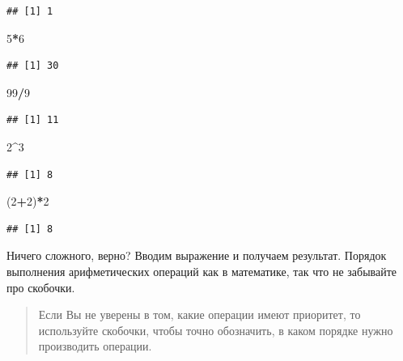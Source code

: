 \documentclass[]{book}
\newenvironment{Shaded}{\begin{snugshade}}{\end{snugshade}}
\newcommand{\DecValTok}[1]{\textcolor[rgb]{0.00,0.00,0.81}{#1}}
\newcommand{\NormalTok}[1]{#1}
\newcommand{\OperatorTok}[1]{\textcolor[rgb]{0.81,0.36,0.00}{\textbf{#1}}}
\begin{document}
\begin{verbatim}
## [1] 1
\end{verbatim}

\begin{Shaded}
\begin{Highlighting}[]
\DecValTok{5}\OperatorTok{*}\DecValTok{6}
\end{Highlighting}
\end{Shaded}

\begin{verbatim}
## [1] 30
\end{verbatim}

\begin{Shaded}
\begin{Highlighting}[]
\DecValTok{99}\OperatorTok{/}\DecValTok{9}
\end{Highlighting}
\end{Shaded}

\begin{verbatim}
## [1] 11
\end{verbatim}

\begin{Shaded}
\begin{Highlighting}[]
\DecValTok{2}\OperatorTok{^}\DecValTok{3}
\end{Highlighting}
\end{Shaded}

\begin{verbatim}
## [1] 8
\end{verbatim}

\begin{Shaded}
\begin{Highlighting}[]
\NormalTok{(}\DecValTok{2}\OperatorTok{+}\DecValTok{2}\NormalTok{)}\OperatorTok{*}\DecValTok{2}
\end{Highlighting}
\end{Shaded}

\begin{verbatim}
## [1] 8
\end{verbatim}

Ничего сложного, верно? Вводим выражение и получаем результат. Порядок выполнения арифметических операций как в математике, так что не забывайте про скобочки.

\begin{quote}
Если Вы не уверены в том, какие операции имеют приоритет, то используйте скобочки, чтобы точно обозначить, в каком порядке нужно производить операции.
\end{quote}
\end{document}
